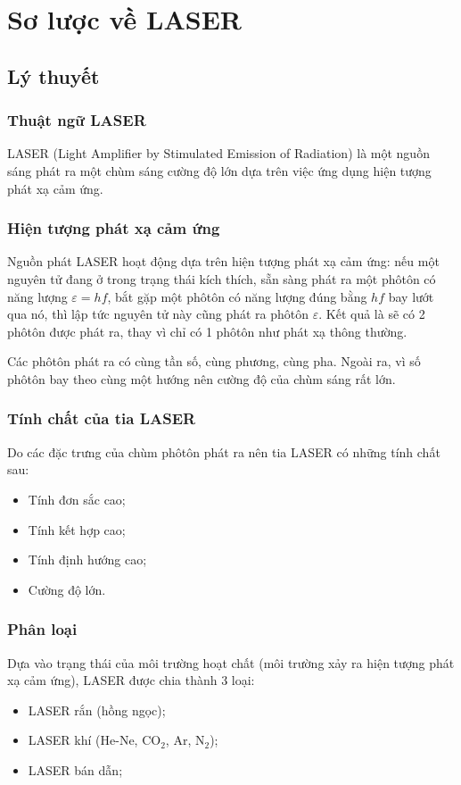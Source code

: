 
\chapter[Sơ lược về LASER]{Sơ lược về LASER}
\section{Lý thuyết}
\subsection{Thuật ngữ LASER}
LASER (Light Amplifier by Stimulated Emission of Radiation) là một nguồn sáng phát ra một chùm sáng cường độ lớn dựa trên việc ứng dụng hiện tượng phát xạ cảm ứng.
\subsection{Hiện tượng phát xạ cảm ứng}
Nguồn phát LASER hoạt động dựa trên hiện tượng phát xạ cảm ứng: nếu một nguyên tử đang ở trong trạng thái kích thích, sẵn sàng phát ra một phôtôn có năng lượng $\varepsilon = hf$, bắt gặp một phôtôn có năng lượng đúng bằng $hf$ bay lướt qua nó, thì lập tức nguyên tử này cũng phát ra phôtôn $\varepsilon$. Kết quả là sẽ có 2 phôtôn được phát ra, thay vì chỉ có 1 phôtôn như phát xạ thông thường.

Các phôtôn phát ra có cùng tần số, cùng phương, cùng pha. Ngoài ra, vì số phôtôn bay theo cùng một hướng nên cường độ của chùm sáng rất lớn.
\subsection{Tính chất của tia LASER}
Do các đặc trưng của chùm phôtôn phát ra nên tia LASER có những tính chất sau:
\begin{itemize}
	\item Tính đơn sắc cao;
	\item Tính kết hợp cao;
	\item Tính định hướng cao;
	\item Cường độ lớn.
\end{itemize}
\subsection{Phân loại}
Dựa vào trạng thái của môi trường hoạt chất (môi trường xảy ra hiện tượng phát xạ cảm ứng), LASER được chia thành 3 loại:
\begin{itemize}
	\item LASER rắn (hồng ngọc);
	\item LASER khí (He-Ne, CO$_2$, Ar, N$_2$);
	\item LASER bán dẫn;
\end{itemize}
